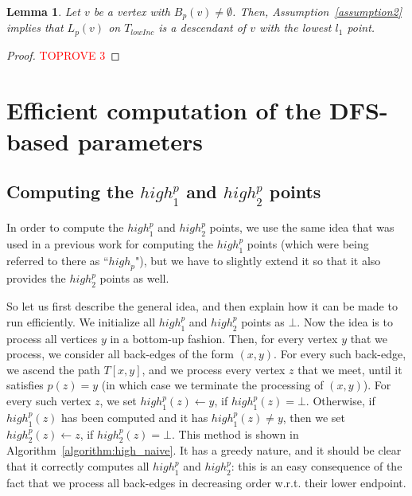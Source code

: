\documentclass[11pt,a4paper]{article}
\newtheorem{lemma}[theorem]{Lemma}
\begin{document}
\begin{lemma}
\label{lemma:lowestl1}
Let $v$ be a vertex with $B_p(v)\neq\emptyset$. Then, Assumption~\ref{assumption2} implies that $L_p(v)$ on $T_\mathit{lowInc}$ is a descendant of $v$ with the lowest $l_1$ point.
\end{lemma}
\begin{proof}\textcolor{red}{TOPROVE 3}\end{proof}







\section{Efficient computation of the DFS-based parameters}
\label{section:efficient_computation}

\subsection{Computing the $\mathit{high}^p_1$ and $\mathit{high}^p_2$ points}
\label{section:computeHigh}
In order to compute the $\mathit{high}^p_1$ and $\mathit{high}^p_2$ points, we use the same idea that was used in a previous work for computing the $\mathit{high}^p_1$ points \cite{DBLP:conf/isaac/GeorgiadisK20} (which were being referred to there as ``$\mathit{high}_p$"), but we have to slightly extend it so that it also provides the $\mathit{high}^p_2$ points as well.

So let us first describe the general idea, and then explain how it can be made to run efficiently. We initialize all $\mathit{high}^p_1$ and $\mathit{high}^p_2$ points as $\bot$. Now the idea is to process all vertices $y$ in a bottom-up fashion. Then, for every vertex $y$ that we process, we consider all back-edges of the form $(x,y)$. For every such back-edge, we ascend the path $T[x,y]$, and we process every vertex $z$ that we meet, until it satisfies $p(z)= y$ (in which case we terminate the processing of $(x,y)$). For every such vertex $z$, we set $\mathit{high}^p_1(z)\leftarrow y$, if $\mathit{high}^p_1(z)=\bot$. Otherwise, if $\mathit{high}^p_1(z)$ has been computed and it has $\mathit{high}^p_1(z)\neq y$, then we set $\mathit{high}^p_2(z)\leftarrow z$, if $\mathit{high}^p_2(z)=\bot$. This method is shown in Algorithm~\ref{algorithm:high_naive}. It has a greedy nature, and it should be clear that it correctly computes all $\mathit{high}^p_1$ and $\mathit{high}^p_2$: this is an easy consequence of the fact that we process all back-edges in decreasing order w.r.t. their lower endpoint.
\end{document}
